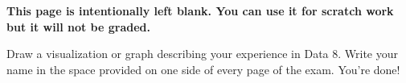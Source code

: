 \documentclass[twoside]{article}
\begin{document}
\clearpage
\textbf{This page is intentionally left blank. You can use it for scratch work but it will not be graded.}
~\newpage

\begin{enumerate}
    
    \clearpage
      
      \clearpage
      
      \clearpage
      
      \clearpage
      
      \clearpage
      
      \vskip 0.4in
      
      \clearpage
      
      \clearpage
      
      \vskip 0.8in
     Draw a visualization or graph describing your experience in Data 8.
     \vfill
      {}Write your name in the space provided on one side of every page of the exam.
     You're done!
\end{enumerate}
\end{document}
